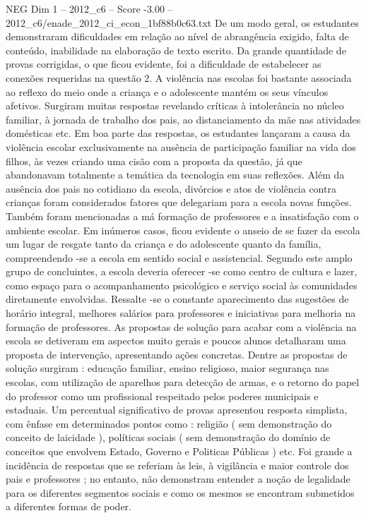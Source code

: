 \begin{textsample}{NEG Dim 1 – 2012\_c6 – Score -3.00 – 2012\_c6/enade\_2012\_ci\_econ\_1bf88b0c63.txt}
De um modo geral, os estudantes demonstraram dificuldades em relação ao nível de abrangência exigido, falta de conteúdo, inabilidade na elaboração de texto escrito.
Da grande quantidade de provas corrigidas, o que ficou evidente, foi a dificuldade de estabelecer as conexões requeridas na questão 2.
A violência nas escolas foi bastante associada ao reflexo do meio onde a criança e o adolescente mantém os seus vínculos afetivos.
Surgiram muitas respostas revelando críticas à intolerância no núcleo familiar, à jornada de trabalho dos pais, ao distanciamento da mãe nas atividades domésticas etc.
Em boa parte das respostas, os estudantes lançaram a causa da violência escolar exclusivamente na ausência de participação familiar na vida dos filhos, às vezes criando uma cisão com a proposta da questão, já que abandonavam totalmente a temática da tecnologia em suas reflexões.
Além da ausência dos pais no cotidiano da escola, divórcios e atos de violência contra crianças foram considerados fatores que delegariam para a escola novas funções.
Também foram mencionadas a má formação de professores e a insatisfação com o ambiente escolar.
Em inúmeros casos, ficou evidente o anseio de se fazer da escola um lugar de resgate tanto da criança e do adolescente quanto da família, compreendendo -se a escola em sentido social e assistencial.
Segundo este amplo grupo de concluintes, a escola deveria oferecer -se como centro de cultura e lazer, como espaço para o acompanhamento psicológico e serviço social às comunidades diretamente envolvidas.
Ressalte -se o constante aparecimento das sugestões de horário integral, melhores salários para professores e iniciativas para melhoria na formação de professores.
As propostas de solução para acabar com a violência na escola se detiveram em aspectos muito gerais e poucos alunos detalharam uma proposta de intervenção, apresentando ações concretas.
Dentre as propostas de solução surgiram : educação familiar, ensino religioso, maior segurança nas escolas, com utilização de aparelhos para detecção de armas, e o retorno do papel do professor como um profissional respeitado pelos poderes municipais e estaduais.
Um percentual significativo de provas apresentou resposta simplista, com ênfase em determinados pontos como : religião ( sem demonstração do conceito de laicidade ), políticas sociais ( sem demonstração do domínio de conceitos que envolvem Estado, Governo e Politicas Públicas ) etc.
Foi grande a incidência de respostas que se referiam às leis, à vigilância e maior controle dos pais e professores ; no entanto, não demonstram entender a noção de legalidade para os diferentes segmentos sociais e como os mesmos se encontram submetidos a diferentes formas de poder.

\end{textsample}
